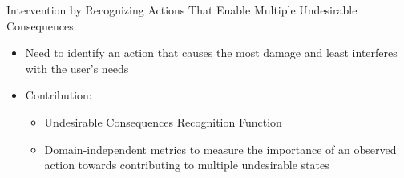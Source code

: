 \begin{frame} {Intervention by Recognizing Actions That Enable Multiple Undesirable Consequences}
\begin{itemize}

\item Need to identify an action that causes the most damage and least interferes with the user's needs
\item Contribution:
\begin{itemize}
\item Undesirable Consequences Recognition Function
\item Domain-independent metrics to measure the importance of an observed action towards contributing to multiple undesirable states
\end{itemize}

\end{itemize}

\end{frame}